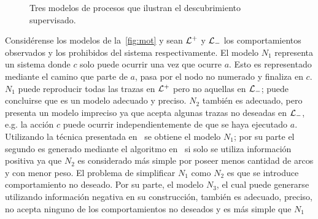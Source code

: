 \begin{example}
    \begin{figure}[t]
        \centering
        \hspace{10mm}
        \hspace{10mm}
        \hspace{10mm}
        \subbottom[\label{sfig:mot.4}]{\scalebox{.9}{}}
        \caption{Tres modelos de procesos que ilustran el descubrimiento supervisado.}
        \label{fig:mot}
    \end{figure}

    Considérense los modelos de la~\autoref{fig:mot} y sean ${\mathcal L}^+$ y ${\mathcal L}_-$ los 
    comportamientos observados y los prohibidos del sistema respectivamente.
    El modelo $N_1$ representa un sistema donde $c$ solo puede ocurrir una vez
    que ocurre $a$.%
    Esto es representado mediante el camino que parte de $a$, pasa por el nodo no
    numerado y finaliza en $c$.
    $N_1$ puede reproducir todas las trazas en ${\mathcal L}^+$ pero no aquellas en ${\mathcal L}_-$; puede
    concluirse que es un modelo adecuado y preciso. $N_2$ también es adecuado, pero presenta un modelo
    impreciso ya que acepta algunas trazas no deseadas en ${\mathcal L}_-$, e.g. la acción $c$ puede ocurrir
    independientemente de que se haya ejecutado $a$. Utilizando la técnica presentada en~\cite{CarmonaC14}
    se obtiene el modelo $N_1$; por su parte  el segundo es generado mediante el algoritmo en~\cite{LeonCB15}
    si solo se utiliza información positiva ya que $N_2$ es considerado más simple por poseer menos 
    cantidad de arcos y con menor peso. El problema de simplificar $N_1$ como $N_2$ es que se introduce
    comportamiento no deseado.
    Por su parte, el modelo $N_3$, el cual puede generarse utilizando información negativa en su construcción,
    también es adecuado, preciso, no acepta ninguno de los comportamientos no deseados y es más simple que $N_1$
\end{example}


